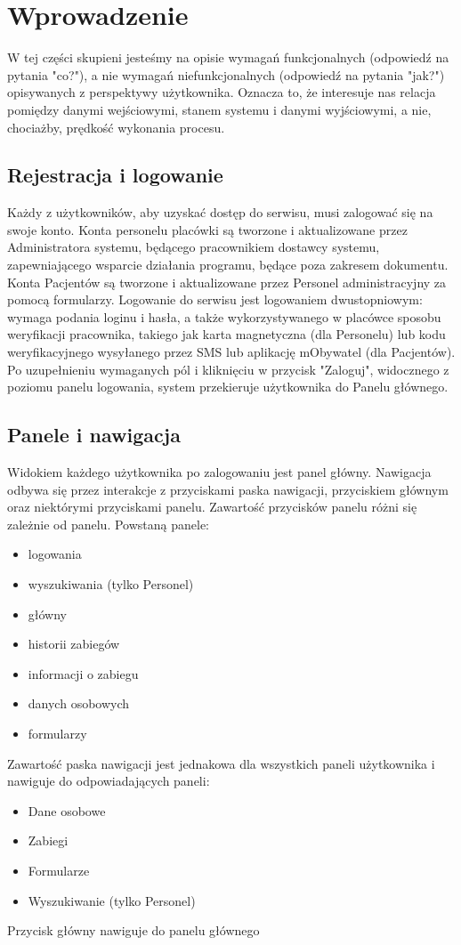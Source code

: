\label{chapter:functionalities}

\section{Wprowadzenie}
W tej części skupieni jesteśmy na opisie wymagań funkcjonalnych (odpowiedź na pytania "co?"), a nie wymagań niefunkcjonalnych (odpowiedź na pytania "jak?") opisywanych z perspektywy użytkownika. Oznacza to, że interesuje nas relacja pomiędzy danymi wejściowymi, stanem systemu i danymi wyjściowymi, a nie, chociażby, prędkość wykonania procesu.

\subsection{Rejestracja i logowanie}
Każdy z użytkowników, aby uzyskać dostęp do serwisu, musi zalogować się na swoje konto. Konta personelu placówki są tworzone i aktualizowane przez Administratora systemu, będącego pracownikiem dostawcy systemu, zapewniającego wsparcie działania programu, będące poza zakresem dokumentu. Konta Pacjentów są tworzone i aktualizowane przez Personel administracyjny za pomocą formularzy. Logowanie do serwisu jest logowaniem dwustopniowym: wymaga podania loginu i hasła, a także wykorzystywanego w placówce sposobu weryfikacji pracownika, takiego jak karta magnetyczna (dla Personelu) lub kodu weryfikacyjnego wysyłanego przez SMS lub aplikację mObywatel (dla Pacjentów). Po uzupełnieniu wymaganych pól i kliknięciu w przycisk "Zaloguj", widocznego z poziomu panelu logowania, system przekieruje użytkownika do Panelu głównego.

\subsection{Panele i nawigacja}
Widokiem każdego użytkownika po zalogowaniu jest panel główny. Nawigacja odbywa się przez interakcje z przyciskami paska nawigacji, przyciskiem głównym oraz niektórymi przyciskami panelu.
Zawartość przycisków panelu różni się zależnie od panelu. Powstaną panele:\begin{itemize}
    \item logowania
    \item wyszukiwania (tylko Personel)
    \item główny
    \item historii zabiegów
    \item informacji o zabiegu
    \item danych osobowych
    \item formularzy
\end{itemize}
Zawartość paska nawigacji jest jednakowa dla wszystkich paneli użytkownika i nawiguje do odpowiadających paneli:\begin{itemize}
    \item Dane osobowe
    \item Zabiegi
    \item Formularze
    \item Wyszukiwanie (tylko Personel)
\end{itemize}
Przycisk główny nawiguje do panelu głównego

